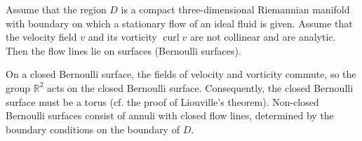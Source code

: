 Assume that the region $D$ is a compact three-dimensional Riemannian manifold with boundary on which a stationary flow of an ideal fluid is given. Assume that the velocity field $v$ and its vorticity $\operatorname{curl} v$ are not collinear and are analytic. Then the flow lines lie on surfaces (Bernoulli surfaces).

On a closed Bernoulli surface, the fields of velocity and vorticity commute, so the group $\mathbb{R}^2$ acts on the closed Bernoulli surface. Consequently, the closed Bernoulli surface must be a torus (cf. the proof of Liouville's theorem). Non-closed Bernoulli surfaces consist of annuli with closed flow lines, determined by the boundary conditions on the boundary of $D$.
